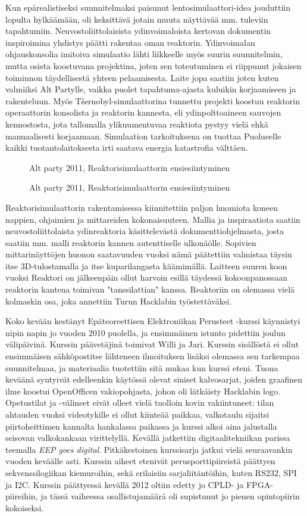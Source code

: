 \documentclass[a4paper]{memoir}
\newcommand{\varitys}{white}
\newlength{\aXa}
\newlength{\aXb}
\newcommand{\jana}[1]{
        \setlength{\aXa}{4cm}
        \setlength{\aXb}{0.4\textwidth}
   \ifodd\value{page}
        \begin{figure}\vspace{-7pt} \hspace{5pt} \colorbox{\varitys}{\parbox{\aXb}{   \textsf{{#1}}  }} \vspace{-7pt}\end{figure}
     \else
        \begin{figure}\vspace{-7pt}    \hspace{-5pt}  \colorbox{\varitys}{\parbox{\aXb}{   \textsf{{#1}} }} \vspace{-7pt}\end{figure}
     \fi
}
\begin{document}
Kun epärealistiseksi suunnitelmaksi paisunut lentosimulaattori-idea jouduttiin lopulta hylkäämään, oli keksittävä jotain muuta näyttävää mm. tuleviin tapahtumiin. Neuvostoliittolaisista ydinvoimaloista kertovan dokumentin inspiroimina yhdistys päätti rakentaa oman reaktorin. Ydinvoimalan ohjauskonsolia imitoiva simulaatio lähti liikkeelle myös suurin suunnitelmin, mutta osista koostuvana projektina, joten sen toteutuminen ei riippunut jokaisen toiminnon täydellisestä yhteen pelaamisesta. Laite jopa saatiin joten kuten valmiiksi Alt Partylle, vaikka puolet tapahtuma-ajasta kuluikin korjaamiseen ja rakenteluun. Myös Tšernobyl-simulaattorina tunnettu projekti koostuu reaktorin operaattorin konsolista ja reaktorin kannesta, eli ydinpolttoaineen sauvojen kennostosta, jota tallomalla ylikuumentuvaa reaktiota pystyy vielä ehkä manuaalisesti korjaamaan. Simulaation tarkoituksena on tuottaa Puolueelle kaikki tuotantolaitoksesta irti saatava energia katastrofia välttäen.

\jana{Alt party 2011, Reaktorisimulaattorin ensiesiintyminen}

Reaktorisimulaattorin rakentamisessa kiinnitettiin paljon huomiota koneen nappien, ohjaimien ja mittareiden kokonaisuuteen. Mallia ja inspiraatiota saatiin neuvostoliittolaista ydinreaktoria käsittelevästä dokumenttiohjelmasta, josta saatiin mm. malli reaktorin kannen autenttiselle ulkonäölle. Sopivien mittarinäyttöjen huonon saatavuuden vuoksi nämä päätettiin valmistaa täysin itse 3D-tulostamalla ja itse kuparilangasta käämimällä. Laitteen suuren koon vuoksi Reaktori on jälkeenpäin ollut harvoin esillä täydessä kokoonpanossaan reaktorin kantena toimivan "tanssilattian" kanssa. Reaktoriin on olemassa vielä kolmaskin osa, joka annettiin Turun Hacklabin työstettäväksi.

Koko kevään kestänyt Epäteoreettisen Elektroniikan Perusteet -kurssi käynnistyi nipin napin jo vuoden 2010 puolella, ja ensimmäinen istunto pidettiin joulun välipäivinä. Kurssin päävetäjinä toimivat Willi ja Jari. Kurssin sisällöstä ei ollut ensimmäisen sähköpostitse lähteneen ilmoituksen lisäksi olemassa sen tarkempaa suunnitelmaa, ja materiaalia tuotettiin sitä mukaa kun kurssi eteni. Tuona keväänä syntyivät edelleenkin käytössä olevat siniset kalvosarjat, joiden graafinen ilme koostui OpenOfficen vakiopohjasta, johon oli lätkäisty Hacklabin logo. Opetustilat ja -välineet eivät olleet vielä tuolloin kovin vakiintuneet: tilan ahtauden vuoksi videotykille ei ollut kiinteää paikkaa, valkotaulu sijaitsi piirtoheittimen kannalta hankalassa paikassa ja kurssi alkoi aina jalustalla seisovan valkokankaan virittelyllä. Kevällä jatkettiin digitaalitekniikan parissa teemalla \textit{EEP goes digital}. Pitkäkestoinen kurssisarja jatkui vielä seuraavankin vuoden keväälle asti. Kurssin aiheet etenivät perusporttipiireistä päättyen sekvenssilogiikan kiemuroihin, sekä erilaisiin sarjaliitäntöihin, kuten RS232, SPI ja I2C. Kurssin päättyessä kevällä 2012 oltiin edetty jo CPLD- ja FPGA-piireihin, ja tässä vaiheessa osallistujamäärä oli supistunut jo pienen opintopiirin kokoiseksi.
\end{document}
